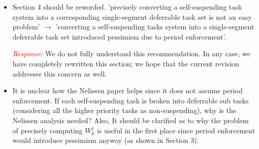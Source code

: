 \documentclass[12pt]{article}
\newenvironment{response}[0]{\textcolor{red}{\emph{Response: }}\color{blue}}{\medskip}
\newcommand{\action}[1]{\textcolor{red}{\emph{\it Actions taken: }}{\color{blue}#1}\medskip}
\begin{document}
\begin{itemize}
\begin{response}
\end{response}

\action{Section 2 was rewritten and expanded to clearly distinguish between the runtime rule (Section 2.2) and the classic analysis (Section 2.3). The runtime rule --- Equation (1) --- is stated in terms of multi-segmented deferrable tasks. }

\action{Section 4 was completely rewritten to more clearly explain that the problem of finding a suitable corresponding task set is open, and likely difficult.}


	\item 
Section 4 should be reworded. 'precisely converting a self-suspending task
system into a corresponding single-segment deferrable task set is not an
easy problem'  $\rightarrow$  'converting a self-suspending tasks system into a
single-segment deferrable task set introduced pessimism due to period
enforcement'. 

\begin{response}
We do not fully understand this recommendation. In any case, we have
completely rewritten this section; we hope that the current revision addresses this concern as well.
\end{response}

\item 
It is unclear how the Nelissen paper helps since it does not
assume period enforcement. If each self-suspending task is broken into
deferrable sub tasks (considering all the higher priority tasks as
non-suspending), why is the Nelissen analysis needed? Also, It should be
clarified as to why the problem of precisely computing $W_k^{j}$ is useful in
the first place since period enforcement would introduce pessimism anyway
(as shown in Section 3).




\end{itemize}
\end{document}
